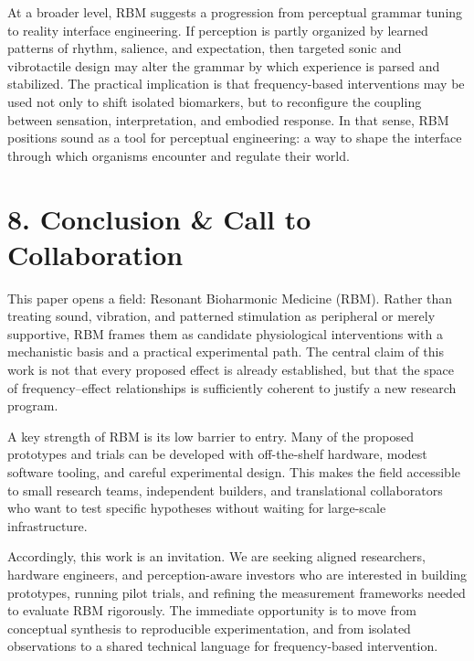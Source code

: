 \documentclass[11pt]{article}
\begin{document}
At a broader level, RBM suggests a progression from perceptual grammar tuning to reality interface engineering. If perception is partly organized by learned patterns of rhythm, salience, and expectation, then targeted sonic and vibrotactile design may alter the grammar by which experience is parsed and stabilized. The practical implication is that frequency-based interventions may be used not only to shift isolated biomarkers, but to reconfigure the coupling between sensation, interpretation, and embodied response. In that sense, RBM positions sound as a tool for perceptual engineering: a way to shape the interface through which organisms encounter and regulate their world.


\section{8. Conclusion \& Call to Collaboration}

This paper opens a field: Resonant Bioharmonic Medicine (RBM). Rather than treating sound, vibration, and patterned stimulation as peripheral or merely supportive, RBM frames them as candidate physiological interventions with a mechanistic basis and a practical experimental path. The central claim of this work is not that every proposed effect is already established, but that the space of frequency--effect relationships is sufficiently coherent to justify a new research program.

A key strength of RBM is its low barrier to entry. Many of the proposed prototypes and trials can be developed with off-the-shelf hardware, modest software tooling, and careful experimental design. This makes the field accessible to small research teams, independent builders, and translational collaborators who want to test specific hypotheses without waiting for large-scale infrastructure.

Accordingly, this work is an invitation. We are seeking aligned researchers, hardware engineers, and perception-aware investors who are interested in building prototypes, running pilot trials, and refining the measurement frameworks needed to evaluate RBM rigorously. The immediate opportunity is to move from conceptual synthesis to reproducible experimentation, and from isolated observations to a shared technical language for frequency-based intervention.
\end{document}
